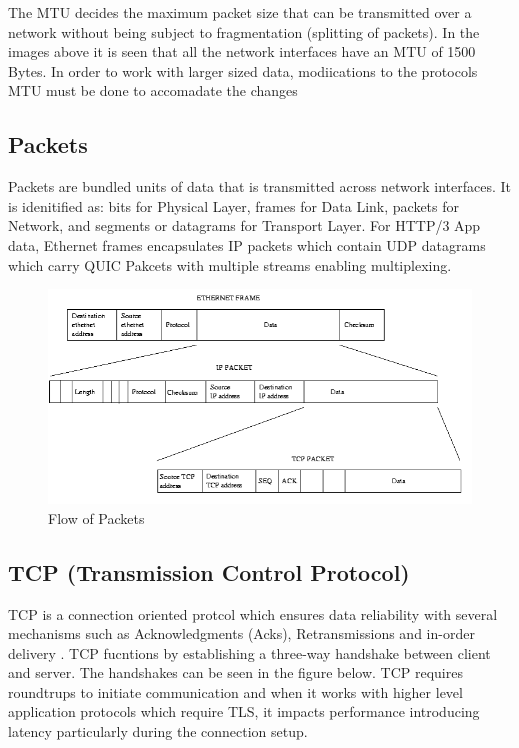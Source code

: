 The MTU decides the maximum packet size that can be transmitted over a network without being subject to fragmentation (splitting of packets). In the images above it is seen that all the network interfaces have an MTU of 1500 Bytes. In order to work with larger sized data, modiications to the protocols MTU must be done to accomadate the changes




\subsection{Packets}

Packets are bundled units of data that is transmitted across network interfaces. It is idenitified as: bits  for Physical Layer, frames for Data Link, packets for Network, and segments or datagrams for Transport Layer. For HTTP/3 App data, Ethernet frames encapsulates IP packets which contain UDP datagrams which carry QUIC Pakcets with multiple streams enabling multiplexing.

\begin{figure}[H]
\caption{Flow of Packets}
\centering
\includegraphics[width=1\textwidth]{SOA/packets.png}
\end{figure}

\subsection{TCP (Transmission Control Protocol)}


TCP is a connection oriented protcol which ensures data reliability with several mechanisms such as Acknowledgments (Acks), Retransmissions and in-order delivery \cite{kurose2017}. TCP fucntions by establishing a three-way handshake between client and server. The handshakes can be seen in the figure below. TCP requires roundtrups to initiate communication and when it works with higher level application protocols which require TLS, it impacts performance introducing latency particularly during the connection setup.


